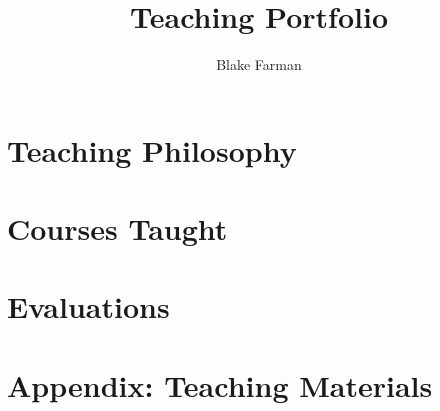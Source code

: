 \documentclass[10pt]{amsart}
\author{Blake Farman}
\title{Teaching Portfolio}
\date{}
\begin{document}
\maketitle

\tableofcontents

\section{Teaching Philosophy}

\section{Courses Taught}

\section{Evaluations}

\newpage
\section{Appendix: Teaching Materials}



\end{document}
